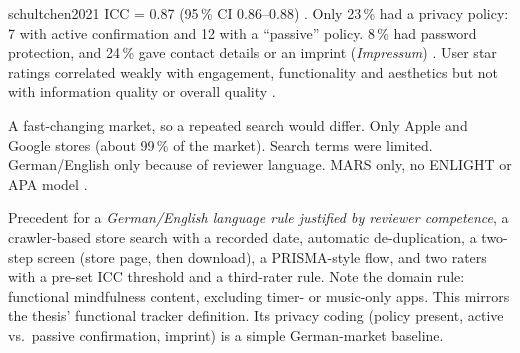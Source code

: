 \begin{papercard}{schultchen2021}
 ICC = 0.87 (95\,\% CI 0.86--0.88) . Only 23\,\% had a privacy policy: 7 with active confirmation and 12 with a ``passive'' policy. 8\,\% had password protection, and 24\,\% gave contact details or an imprint (\emph{Impressum}) . User star ratings correlated weakly with engagement, functionality and aesthetics but not with information quality or overall quality .

 A fast-changing market, so a repeated search would differ. Only Apple and Google stores (about 99\,\% of the market). Search terms were limited. German/English only because of reviewer language. MARS only, no ENLIGHT or APA model .

 Precedent for a \emph{German/English language rule justified by reviewer competence}, a crawler-based store search with a recorded date, automatic de-duplication, a two-step screen (store page, then download), a PRISMA-style flow, and two raters with a pre-set ICC threshold and a third-rater rule. Note the domain rule: functional mindfulness content, excluding timer- or music-only apps. This mirrors the thesis' functional tracker definition. Its privacy coding (policy present, active vs.\ passive confirmation, imprint) is a simple German-market baseline.
\end{papercard}
